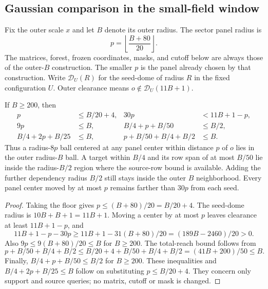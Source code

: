\subsection{Gaussian comparison in the small-field window}
\label{sec:ex-lattice-actual-reader-small-window}

Fix the outer scale $x$ and let $B$ denote its outer radius.
The sector panel radius is
\[
 p=\left\lfloor\frac{B+80}{20}\right\rfloor.
\]
The matrices, forest, frozen coordinates, masks, and cutoff below are
always those of the outer-$B$ construction.  The smaller $p$ is the
panel already chosen by that construction.
Write $\mathcal D_U(R)$ for the seed-dome of radius $R$ in the fixed
configuration $U$.  Outer clearance means
$o\notin\mathcal D_U(11B+1)$.

\begin{lemma}
\label{lem:ex-lattice-small-window-geometry}
If $B\ge200$, then
\begin{equation}\label{eq:ex-lattice-small-window-geometry}
\begin{aligned}
 p&\le B/20+4, & 30p&<11B+1-p,\\
 9p&\le B, & B/4+p+B/50&\le B/2,\\
 B/4+2p+B/25&\le B, &p+B/50+B/4+B/2&\le B.
\end{aligned}
\end{equation}
Thus a radius-$8p$ ball centered at any panel center within distance
$p$ of $o$ lies in the outer radius-$B$ ball.  A target within $B/4$
and its row span of at most $B/50$ lie inside the radius-$B/2$ region
where the source-row bound is available.  Adding the further dependency
radius $B/2$ still stays inside the outer $B$ neighborhood.  Every
panel center moved by at most $p$ remains farther than $30p$ from each
seed.
\end{lemma}

\begin{proof}
Taking the floor gives $p\le(B+80)/20=B/20+4$.
The seed-dome radius is $10B+B+1=11B+1$.  Moving a center by at most
$p$ leaves clearance at least $11B+1-p$, and
\[
 11B+1-p-30p\ge 11B+1-31(B+80)/20
                  =(189B-2460)/20>0.
\]
Also $9p\le9(B+80)/20\le B$ for $B\ge200$.  The total-reach bound
follows from
\[
 p+B/50+B/4+B/2\le B/20+4+ B/50+B/4+B/2
                         =(41B+200)/50\le B.
\]
Finally, $B/4+p+B/50\le B/2$ for $B\ge200$.  These inequalities
and $B/4+2p+B/25\le B$ follow on substituting $p\le B/20+4$.
They concern only support and source queries; no matrix, cutoff or mask
is changed.
\end{proof}

